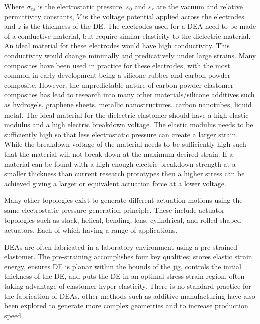 Where $\sigma_{es}$ is the electrostatic pressure, $\varepsilon_0$ and $\varepsilon_r$ are the vacuum and relative permittivity constants, $V$ is the voltage potential applied across the electrodes and $z$ is the thickness of the DE. The electrodes used for a DEA need to be made of a conductive material, but require similar elasticity to the dielectric material. An ideal material for these electrodes would have high conductivity. This conductivity would change minimally and predicatively under large strains. Many composites have been used in practice for these electrodes, with the most common in early development being a silicone rubber and carbon powder composite. However, the unpredictable nature of carbon powder elastomer composites has lead to research into many other materials/silicone additives such as hydrogels, graphene sheets, metallic nanostructures, carbon nanotubes, liquid metal\citep{Liu2013,Rogers2013,Bele2018,Quinsaat2015}. The ideal material for the dielectric elastomer should have a high elastic modulus and a high electric breakdown voltage. The elastic modulus needs to be sufficiently high so that less electrostatic pressure can create a larger strain. While the breakdown voltage of the material needs to be sufficiently high such that the material will not break down at the maximum desired strain. If a material can be found with a high enough electric breakdown strength at a smaller thickness than current research prototypes then a higher stress can be achieved giving a larger or equivalent actuation force at a lower voltage.

Many other topologies exist to generate different actuation motions using the same electrostatic pressure generation principle. These include actuator topologies such as stack\citep{Hau2018,Kovacs2009}, helical\citep{Carpi2012}, bending\citep{Pfeil2020}, lens\citep{Ghilardi2019}, cylindrical, and rolled shaped actuators\citep{Amin2018}. Each of which having a range of applications.

DEAs are often fabricated in a laboratory environment using a pre-strained elastomer. The pre-straining accomplishes four key qualities; stores elastic strain energy, ensures DE is planar within the bounds of the jig, controls the initial thickness of the DE, and puts the DE in an optimal stress-strain region, often taking advantage of elastomer hyper-elasticity. There is no standard practice for the fabrication of DEAs, other methods such as additive manufacturing have also been explored to generate more complex geometries and to increase production speed\citep{Park2018,McCoul2017}.

